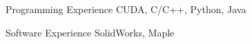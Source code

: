 
\vspace{-6mm}





\begin{cvskills}


\cvskill
{Programming Experience} %
{CUDA, C/C++, Python, Java} %



\cvskill
{Software Experience} %
{SolidWorks, Maple} %


\end{cvskills}